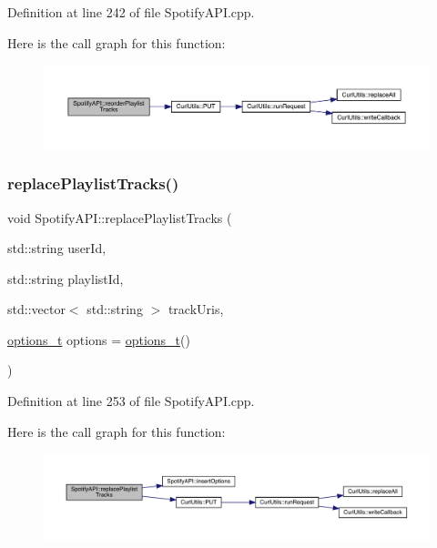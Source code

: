 Definition at line 242 of file Spotify\+A\+P\+I.\+cpp.

Here is the call graph for this function\+:
\nopagebreak
\begin{figure}[H]
\begin{center}
\leavevmode
\includegraphics[width=350pt]{class_spotify_a_p_i_aa9fcff75e9b8067c482306f0af0fc519_cgraph}
\end{center}
\end{figure}
\mbox{\label{class_spotify_a_p_i_a5a5d099d9be138440ad095cf8d7e6a96}} 
\subsubsection{\texorpdfstring{replace\+Playlist\+Tracks()}{replacePlaylistTracks()}}
{\footnotesize\ttfamily void Spotify\+A\+P\+I\+::replace\+Playlist\+Tracks (\begin{DoxyParamCaption}\item[{std\+::string}]{user\+Id,  }\item[{std\+::string}]{playlist\+Id,  }\item[{std\+::vector$<$ std\+::string $>$}]{track\+Uris,  }\item[{\mbox{\hyperlink{_spotify_a_p_i_8h_a0ff5cac1a4007bb330b7d9939650c283}{options\+\_\+t}}}]{options = {\ttfamily \mbox{\hyperlink{_spotify_a_p_i_8h_a0ff5cac1a4007bb330b7d9939650c283}{options\+\_\+t}}()} }\end{DoxyParamCaption})}



Definition at line 253 of file Spotify\+A\+P\+I.\+cpp.

Here is the call graph for this function\+:
\nopagebreak
\begin{figure}[H]
\begin{center}
\leavevmode
\includegraphics[width=350pt]{class_spotify_a_p_i_a5a5d099d9be138440ad095cf8d7e6a96_cgraph}
\end{center}
\end{figure}
\mbox{\label{class_spotify_a_p_i_ac7b630b1b98e6cfb047e7f107e862673}} 
